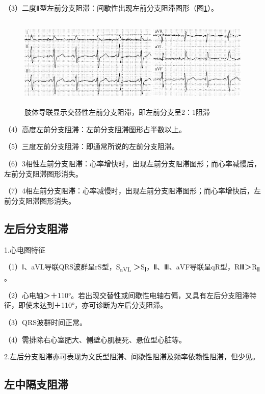 （3）二度Ⅱ型左前分支阻滞：间歇性出现左前分支阻滞图形（图\ref{fig21-8}）。

\begin{figure}[!htbp]
 \centering
 \includegraphics[width=5.58333in,height=1.72917in]{./images/Image00356.jpg}
 \captionsetup{justification=centering}
 \caption{肢体导联显示交替性左前分支阻滞，即左前分支呈2：1阻滞}
 \label{fig21-8}
  \end{figure} 

（4）高度左前分支阻滞：左前分支阻滞图形占半数以上。

（5）三度左前分支阻滞：即通常所说的左前分支阻滞。

（6）3相性左前分支阻滞：心率增快时，出现左前分支阻滞图形；而心率减慢后，左前分支阻滞图形消失。

（7）4相左前分支阻滞：心率减慢时，出现左前分支阻滞图形；而心率增快后，左前分支阻滞图形消失。

\protect\hypertarget{text00028.htmlux5cux23subid347}{}{}

\subsection{左后分支阻滞}

1.心电图特征

（1）Ⅰ、aVL导联QRS波群呈rS型，S\textsubscript{aVL} ＞S\textsubscript{Ⅰ}，Ⅱ、Ⅲ、aVF导联呈qR型，RⅢ＞R\textsubscript{Ⅱ} 。

（2）心电轴＞＋110°。若出现交替性或间歇性电轴右偏，又具有左后分支阻滞特征，即使未达到＋110°，亦可诊断为左后分支阻滞。

（3）QRS波群时间正常。

（4）需排除右心室肥大、侧壁心肌梗死、悬位型心脏等。

2.左后分支阻滞亦可表现为文氏型阻滞、间歇性阻滞及频率依赖性阻滞，但少见。

\protect\hypertarget{text00028.htmlux5cux23subid348}{}{}

\subsection{左中隔支阻滞}

